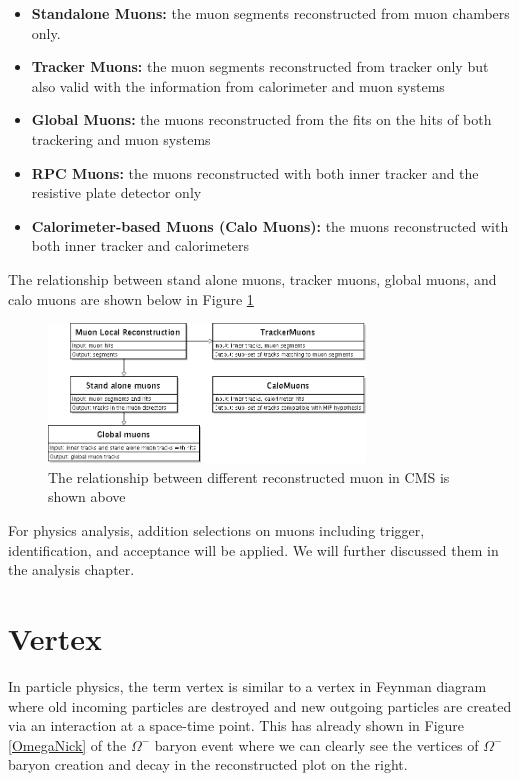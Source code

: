 \begin{itemize}
\item \textbf{Standalone Muons:} the muon segments reconstructed from muon chambers only.
\item \textbf{Tracker Muons:} the muon segments reconstructed from tracker only but also valid with the information from calorimeter and muon systems
\item \textbf{Global Muons:} the muons reconstructed from the fits on the hits of both trackering and muon systems
\item \textbf{RPC Muons:} the muons reconstructed with both inner tracker and the resistive plate detector only 
\item \textbf{Calorimeter-based Muons (Calo Muons):} the muons reconstructed with both inner tracker and calorimeters  
\end{itemize}

The relationship between stand alone muons, tracker muons, global muons, and calo muons are shown below in Figure \ref{MuonRel}

\begin{figure}[hbtp]
\begin{center}
\includegraphics[width=0.75\textwidth]{Figures/Chapter3/MuonRel}
\caption{The relationship between different reconstructed muon in CMS is shown above}
\label{MuonRel}
\end{center}
\end{figure} 

For physics analysis, addition selections on muons including trigger, identification, and acceptance will be applied. We will further discussed them in the analysis chapter.

\section{Vertex}

In particle physics, the term vertex is similar to a vertex in Feynman diagram where old incoming particles are destroyed and new outgoing particles are created via an interaction at a space-time point. This has already shown in Figure \ref{OmegaNick} of the $\Omega^-$ baryon event where we can clearly see the vertices of $\Omega^-$ baryon creation and decay in the reconstructed plot on the right. 

